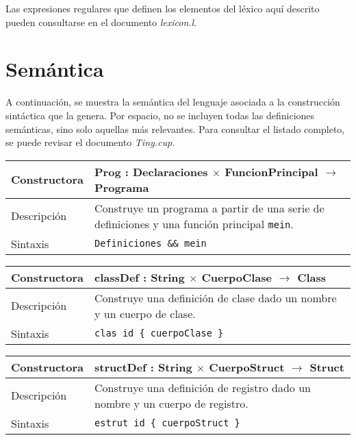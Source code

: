 \documentclass[10pt,a4paper]{article}
\begin{document}
Las expresiones regulares que definen los elementos del léxico aquí descrito pueden consultarse en el documento \textit{lexicon.l}.

\section{Semántica}

A continuación, se muestra la semántica del lenguaje asociada a la construcción sintáctica que la genera. Por espacio, no se incluyen todas las definiciones semánticas, sino solo aquellas más relevantes. Para consultar el listado completo, se puede revisar el documento \textit{Tiny.cup}.

\begin{center}
    \begin{tabular}[h]{|p{}|p{}|}
        \hline
        Constructora & Prog : Declaraciones $\times$ FuncionPrincipal $\rightarrow$ Programa \\
        \hline
        Descripción & Construye un programa a partir de una serie de definiciones y una función principal \texttt{mein}. \\
        \hline
        Sintaxis & \texttt{Definiciones \&\& mein} \\
        \hline
    \end{tabular}
\end{center}

\begin{center}
    \begin{tabular}[h]{|p{}|p{}|}
        \hline
        Constructora & classDef : String $\times$ CuerpoClase $\rightarrow$ Class \\
        \hline
        Descripción & Construye una definición de clase dado un nombre y un cuerpo de clase. \\
        \hline
        Sintaxis & \texttt{clas id \{ cuerpoClase \}} \\
        \hline
    \end{tabular}
\end{center}

\begin{center}
        \begin{tabular}[h]{|p{}|p{}|}
            \hline
            Constructora & structDef : String $\times$ CuerpoStruct $\rightarrow$ Struct \\
            \hline
            Descripción & Construye una definición de registro dado un nombre y un cuerpo de registro. \\
            \hline
            Sintaxis & \texttt{estrut id \{ cuerpoStruct \}} \\
            \hline
        \end{tabular}
\end{center}
\end{document}
